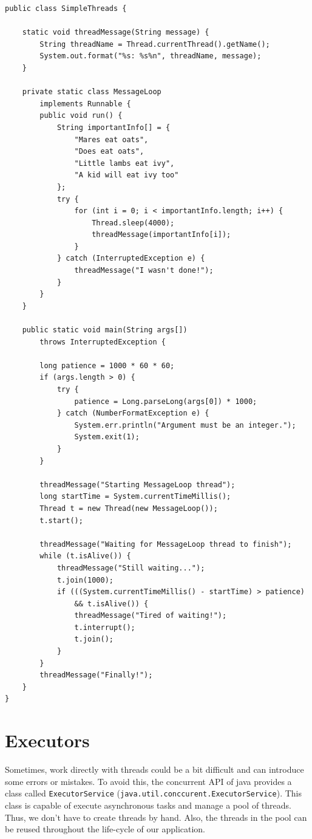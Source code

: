 \documentclass[openany, a4paper]{book}
\theoremstyle{break}
\theoremstyle{example}
\theoremstyle{note}
\theoremstyle{break}
\theoremstyle{exercise}
\begin{document}
\begin{verbatim}
public class SimpleThreads {

    static void threadMessage(String message) {
        String threadName = Thread.currentThread().getName();
        System.out.format("%s: %s%n", threadName, message);
    }

    private static class MessageLoop
        implements Runnable {
        public void run() {
            String importantInfo[] = {
                "Mares eat oats",
                "Does eat oats",
                "Little lambs eat ivy",
                "A kid will eat ivy too"
            };
            try {
                for (int i = 0; i < importantInfo.length; i++) {
                    Thread.sleep(4000);
                    threadMessage(importantInfo[i]);
                }
            } catch (InterruptedException e) {
                threadMessage("I wasn't done!");
            }
        }
    }

    public static void main(String args[])
        throws InterruptedException {

        long patience = 1000 * 60 * 60;
        if (args.length > 0) {
            try {
                patience = Long.parseLong(args[0]) * 1000;
            } catch (NumberFormatException e) {
                System.err.println("Argument must be an integer.");
                System.exit(1);
            }
        }

        threadMessage("Starting MessageLoop thread");
        long startTime = System.currentTimeMillis();
        Thread t = new Thread(new MessageLoop());
        t.start();

        threadMessage("Waiting for MessageLoop thread to finish");
        while (t.isAlive()) {
            threadMessage("Still waiting...");
            t.join(1000);
            if (((System.currentTimeMillis() - startTime) > patience)
                && t.isAlive()) {
                threadMessage("Tired of waiting!");
                t.interrupt();
                t.join();
            }
        }
        threadMessage("Finally!");
    }
}
\end{verbatim}


\section{Executors}
\label{sec:org63efd7b}

Sometimes, work directly with threads could be a bit difficult and can
introduce some errors or mistakes. To avoid this, the concurrent API of java
provides a class called \texttt{ExecutorService}
(\texttt{java.util.conccurent.ExecutorService}). This class is capable of execute
asynchronous tasks and manage a pool of threads. Thus, we don't have to
create threads by hand. Also, the threads in the pool can be reused
throughout the life-cycle of our application.
\end{document}
